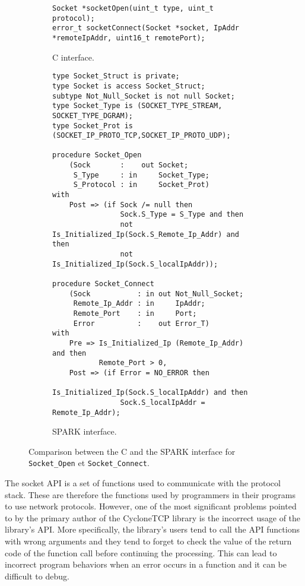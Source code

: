 \documentclass[runningheads]{llncs}
\begin{document}
\begin{figure}[t]
\begin{subfigure}{\textwidth}
\begin{lstlisting}[style=C, frame=bottomline]
Socket *socketOpen(uint_t type, uint_t protocol);
error_t socketConnect(Socket *socket, IpAddr *remoteIpAddr, uint16_t remotePort);
\end{lstlisting}
\caption{C interface.}
\label{Fig:socketInterface:C}
\end{subfigure}
\begin{subfigure}{\textwidth}
\begin{lstlisting}[style=Spark, frame=bottomline]
type Socket_Struct is private;
type Socket is access Socket_Struct;
subtype Not_Null_Socket is not null Socket;
type Socket_Type is (SOCKET_TYPE_STREAM, SOCKET_TYPE_DGRAM);
type Socket_Prot is (SOCKET_IP_PROTO_TCP,SOCKET_IP_PROTO_UDP);

procedure Socket_Open
    (Sock       :    out Socket;
     S_Type     : in     Socket_Type;
     S_Protocol : in     Socket_Prot)
with
    Post => (if Sock /= null then
                Sock.S_Type = S_Type and then
                not Is_Initialized_Ip(Sock.S_Remote_Ip_Addr) and then
                not Is_Initialized_Ip(Sock.S_localIpAddr));

procedure Socket_Connect
    (Sock           : in out Not_Null_Socket;
     Remote_Ip_Addr : in     IpAddr;
     Remote_Port    : in     Port;
     Error          :    out Error_T)
with
    Pre => Is_Initialized_Ip (Remote_Ip_Addr) and then
           Remote_Port > 0,
    Post => (if Error = NO_ERROR then
                Is_Initialized_Ip(Sock.S_localIpAddr) and then
                Sock.S_localIpAddr = Remote_Ip_Addr);
\end{lstlisting}
\caption{SPARK interface.}
\label{Fig:socketInterface:SPARK}
\end{subfigure}
\caption{Comparison between the C and the SPARK interface for \texttt{Socket\_Open} et \texttt{Socket\_Connect}.}
\label{Fig:socketInterface}
\end{figure}

    The socket API is a set of functions used to communicate with the protocol stack. These are therefore the functions used
    by programmers in their programs to use network protocols. However, one of the most significant problems pointed to by the
    primary author of the CycloneTCP library is the incorrect usage of the library's API. More specifically, the library's users
    tend to call the API functions with wrong arguments and they tend to forget to check the value of the return code of the
    function call before continuing the processing. This can lead to incorrect program behaviors when an error occurs in a function
    and it can be difficult to debug.
\end{document}
